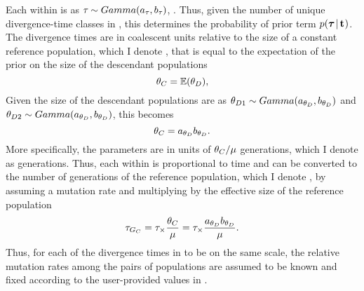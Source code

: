 \begin{linenomath}
Each \divTime{} within \divTimeVector is \iid as $\tau_{} \sim
Gamma(a_{\tau_{}}, b_{\tau_{}})$,
.
Thus, given the number of unique divergence-time classes in
\divTimeIndexVector, this determines the probability of prior term
$p(\boldsymbol{\tau_{}} \,|\, \mathbf{t_{}})$.
The divergence times are in coalescent units relative to the size of
a constant reference population, which I denote , that is equal to
the expectation of the prior on the size of the descendant populations
\begin{equation}
    \myTheta{C} = \mathbb{E}(\descendantTheta{}{}),
    \label{eq:thetaC}
\end{equation}
Given the size of the descendant populations are \iid as
$\descendantTheta{1}{} \sim Gamma(\gammaShape{\descendantTheta{}{}},
\gammaScale{\descendantTheta{}{}})$ and
$\descendantTheta{2}{} \sim Gamma(\gammaShape{\descendantTheta{}{}},
\gammaScale{\descendantTheta{}{}})$,
this becomes
\begin{equation}
    \myTheta{C} = \gammaShape{\descendantTheta{}{}}\gammaScale{\descendantTheta{}{}}.
    \label{eq:thetaCGamma}
\end{equation}
More specifically, the \divTime{} parameters are in units of
$\theta_{C}/\mu$ generations, which I denote as \globalcoalunit
generations.
Thus, each \divTime{} within \divTimeVector is proportional to time and can be
converted to the number of generations of the reference population, which I
denote , by assuming a mutation rate and multiplying by the
effective size of the reference population
\begin{equation}
    \divTime{G_C} = \divTime \times \frac{\myTheta{C}}{\mutationRate} = \divTime
    \times \frac{
    \gammaShape{\descendantTheta{}{}}\gammaScale{\descendantTheta{}{}}}
    {\mutationRate}.
    \label{eq:divTimeGenerations}
\end{equation}
Thus, for each of the divergence times in \divTimeVector to be on the same
scale, the relative mutation rates among the pairs of populations are assumed
to be known and fixed according to the user-provided values in
\mutationRateScalarConstantVector.
\end{linenomath}

